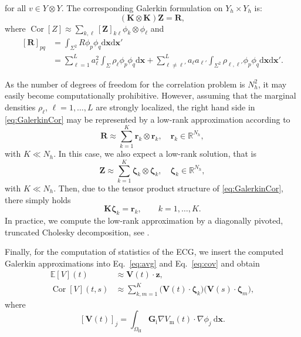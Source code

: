 \documentclass[runningheads]{llncs}
\newcommand{\bs}[1]{\boldsymbol{#1}}
\newcommand{\Vm}{V_\mathrm{m}}
\newcommand{\vx}{\mathbf{x}}
\newcommand{\tG}{\mathbf{G}}
\newcommand{\tGi}{\tG_\mathrm{i}}
\newcommand{\dd}{\mathrm{d}}
\newcommand{\EE}{\mathbb{E}}
\newcommand{\OmegaH}{\Omega_\mathrm{H}}
\DeclareMathOperator{\Cor}{Cor}
\begin{document}
for all $v\in Y\otimes Y$.  The corresponding Galerkin formulation on
$Y_h \times Y_h$ is:
\begin{equation}\label{eq:GalerkinCor}
(\mathbf{K}\otimes\mathbf{K})\mathbf{Z} = \mathbf{R},
\end{equation}
where $\Cor[Z]\approx \sum_{k,\ell} [\mathbf{Z}]_{k\ell}
\phi_k\otimes\phi_\ell$
and
\begin{equation}\label{eq:Rassemble}
\begin{split}
[\mathbf{R}]_{pq} &= \int_{\Sigma^2} R\phi_p\phi_q \dd\vx\dd\vx' \\
&= \sum_{\ell=1}^L a_\ell^2 \int_\Sigma \rho_\ell\phi_p \phi_q \dd\vx
+ \sum_{\ell\neq\ell'}^L a_\ell a_{\ell'}
\int_{\Sigma^2} \rho_{\ell,\ell'}\phi_p \phi_q \dd\vx\dd\vx'.
\end{split}
\end{equation}

As the number of degrees of freedom for the correlation problem is \(N_h^2\),
it may easily become computationally prohibitive. However, assuming that the
marginal densities \(\rho_\ell\), \(\ell=1,\ldots,L\) are strongly localized, the
right hand side in \eqref{eq:GalerkinCor} may be represented by a low-rank
approximation according to
\[
\mathbf{R}\approx \sum_{k=1}^K \bm{r}_k \otimes \bm{r}_k,
\quad\bm{r}_k\in\mathbb{R}^{N_h},
\]
with \(K\ll N_h\).
In this case, we also expect a low-rank solution, that is
\[
\mathbf{Z} \approx \sum_{k=1}^K \bm{\zeta}_k \otimes \bm{\zeta}_k,
\quad\bs{\zeta}_k\in\mathbb{R}^{N_h},
\]
with $K \ll N_h$. 
Then, due to the tensor product structure of \eqref{eq:GalerkinCor}, there
simply holds
\begin{equation}\label{eq:Kzeta}
\mathbf{K} \bm{\zeta}_k = \bm{r}_k, \qquad k=1,\ldots,K.
\end{equation}
In practice, we compute the low-rank approximation by a diagonally
pivoted, truncated Cholesky decomposition, see \cite{HPS12}.

Finally, for the computation of statistics of the ECG, we insert the computed
Galerkin approximations into Eq.~\eqref{eq:avg} and Eq.~\eqref{eq:cov} and
obtain
\begin{align}
\EE[V](t)    &\approx \mathbf{V}(t)\cdot \mathbf{z}, \label{eq:EEV} \\
\Cor[V](t,s) &\approx \sum_{k,m=1}^K\big(\mathbf{V}(t)
\cdot \bm{\zeta}_k\big)\big(\mathbf{V}(s)\cdot \bm{\zeta}_m\big), \label{eq:CorV}
\end{align}
where
\[
[\mathbf{V}(t)]_j = \int_{\OmegaH} \tGi\nabla\Vm(t)\cdot \nabla\phi_j\:\dd\vx.
\]
\end{document}
